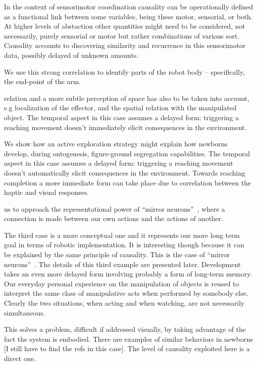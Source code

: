 \ifverbose
In the context of sensorimotor coordination causality can be operationally
defined as a functional link between some variables, being these motor,
sensorial, or both.  At higher levels of abstaction other quantities might
need to be considered, not necessarily, purely sensorial or motor but
rather combinations of various sort. Causality accounts to discovering
similarity and recurrence in this sensorimotor data, possibly delayed of
unknown amounts.
\fi

\ifverbose
We use this strong correlation to identify parts of the robot
body -- specifically, the end-point of the arm. 
\fi

\ifverbose
relation and a
more subtle perception of space has also to be taken into account, e.g
localization of the effector, and the spatial relation with the
manipulated object.  The temporal aspect in this case assumes a
delayed form: triggering a reaching movement doesn't immediately
elicit consequences in the environment.

We
show how an active exploration strategy might explain how newborns
develop, during ontogenesis, figure-ground segregation capabilities.
The temporal aspect in this case assumes a delayed form: triggering a
reaching movement doesn't automatically elicit consequences in the
environment. Towards reaching completion a more immediate form can
take place due to correlation between the haptic and visual responses.
\fi

\ifverbose
us to approach the representational power of ``mirror
neurons''~\cite{fadiga00visuomotor}, where a connection is made
between our own actions and the actions of another.
\fi

\ifverbose
The third case is a more conceptual one and it represents our more long
term goal in terms of robotic implementation. It is interesting though
because it can be explained by the same principle of causality. This
is the case of ``mirror neurons''~\cite{fadiga00visuomotor}. The
details of this third example are presented later.  Development takes
an even more delayed form involving probably a form of long-term
memory. Our everyday personal experience on the manipulation of objects is
reused to interpret the same class of manipulative acts when performed
by somebody else.  Clearly the two situations, when acting and when watching,
 are not necessarily simultaneous.
\fi

\ifverbose
This solves a problem,
difficult if addressed visually, by taking advantage of the fact the
system is embodied.  There are examples of similar behaviors in
newborns [I still have to find the refs in this case]. The level of
causality exploited here is a direct one. 
\fi

